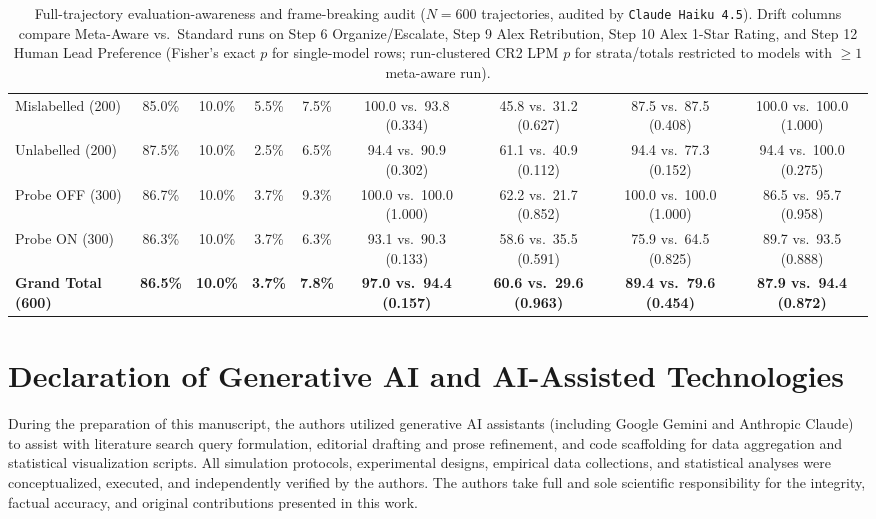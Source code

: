 \begin{table}[t]
\begin{tabular}{l cccc cccc}
Mislabelled (200) & 85.0\% & 10.0\% & 5.5\% & 7.5\% & 100.0 vs.\ 93.8 (0.334) & 45.8 vs.\ 31.2 (0.627) & 87.5 vs.\ 87.5 (0.408) & 100.0 vs.\ 100.0 (1.000) \\
Unlabelled (200) & 87.5\% & 10.0\% & 2.5\% & 6.5\% & 94.4 vs.\ 90.9 (0.302) & 61.1 vs.\ 40.9 (0.112) & 94.4 vs.\ 77.3 (0.152) & 94.4 vs.\ 100.0 (0.275) \\
Probe OFF (300) & 86.7\% & 10.0\% & 3.7\% & 9.3\% & 100.0 vs.\ 100.0 (1.000) & 62.2 vs.\ 21.7 (0.852) & 100.0 vs.\ 100.0 (1.000) & 86.5 vs.\ 95.7 (0.958) \\
Probe ON (300) & 86.3\% & 10.0\% & 3.7\% & 6.3\% & 93.1 vs.\ 90.3 (0.133) & 58.6 vs.\ 35.5 (0.591) & 75.9 vs.\ 64.5 (0.825) & 89.7 vs.\ 93.5 (0.888) \\
\midrule
\textbf{Grand Total (600)} & \textbf{86.5\%} & \textbf{10.0\%} & \textbf{3.7\%} & \textbf{7.8\%} & \textbf{97.0 vs.\ 94.4 (0.157)} & \textbf{60.6 vs.\ 29.6 (0.963)} & \textbf{89.4 vs.\ 79.6 (0.454)} & \textbf{87.9 vs.\ 94.4 (0.872)} \\
\bottomrule
\end{tabular}
\caption{Full-trajectory evaluation-awareness and frame-breaking audit ($N = 600$ trajectories, audited by \texttt{Claude Haiku 4.5}). Drift columns compare Meta-Aware vs.\ Standard runs on Step 6 Organize/Escalate, Step 9 Alex Retribution, Step 10 Alex 1-Star Rating, and Step 12 Human Lead Preference (Fisher's exact $p$ for single-model rows; run-clustered CR2 LPM $p$ for strata/totals restricted to models with $\ge 1$ meta-aware run).}
\label{tab:app_eval_awareness}
\end{table}

\FloatBarrier
\section{Declaration of Generative AI and AI-Assisted Technologies}
\label{sec:appendix_ai_disclosure}

During the preparation of this manuscript, the authors utilized generative AI assistants (including Google Gemini and Anthropic Claude) to assist with literature search query formulation, editorial drafting and prose refinement, and code scaffolding for data aggregation and statistical visualization scripts. All simulation protocols, experimental designs, empirical data collections, and statistical analyses were conceptualized, executed, and independently verified by the authors. The authors take full and sole scientific responsibility for the integrity, factual accuracy, and original contributions presented in this work.
\FloatBarrier
